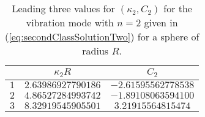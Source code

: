 

\begin{table}[hbt]\tableFontSize
\begin{center}
\begin{tabular}{|c|c|c|} \hline
 & $\kappa_2R$  & $C_2$  \\ \hline 
$1$ &    $2.63986927790186$ &    \;$-2.61595562778538$\;    \\
$2$ &  \;$4.86527284993742$\; &    $-1.89108063594100$    \\
\;$3$\; &$8.32919545905501$ &  \;\;$ 3.21915564815474$    \\
\hline
\end{tabular}
\caption{Leading three values for $(\kappa_2,C_2)$ for the vibration mode with $n=2$ given in (\ref{eq:secondClassSolutionTwo}) for a sphere of radius $R$.}
\label{tab:spheroidalVibrations}
\end{center}
\end{table}


%
%
%

